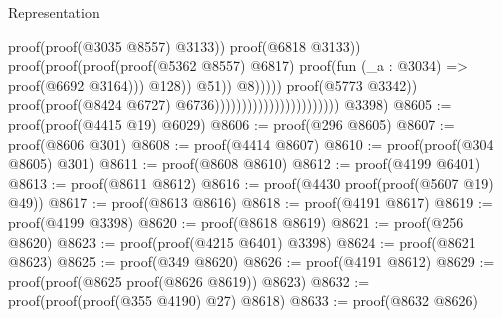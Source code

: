 \begin{lexlean}{Representation}
\begin{coremodule}
                                                                                                      proof(proof(@3035
                                                                                                            @8557)
                                                                                                          @3133))
                                                                                                    proof(@6818
                                                                                                        @3133))
                                                                                                  proof(proof(proof(proof(@5362
                                                                                                            @8557)
                                                                                                          @6817)
                                                                                                        proof(fun (_a : @3034) =>
                                                                                                          proof(@6692
                                                                                                              @3164)))
                                                                                                      @128))
                                                                                                @51))
                                                                                          @8)))))
                                                                            proof(@5773 @3342))
                                                                          proof(proof(@8424 @6727)
                                                                              @6736)))))))))))))))))))))))
      @3398)
@8605 := proof(proof(@4415 @19) @6029)
@8606 := proof(@296 @8605)
@8607 := proof(@8606 @301)
@8608 := proof(@4414 @8607)
@8610 := proof(proof(@304 @8605) @301)
@8611 := proof(@8608 @8610)
@8612 := proof(@4199 @6401)
@8613 := proof(@8611 @8612)
@8616 := proof(@4430 proof(proof(@5607 @19) @49))
@8617 := proof(@8613 @8616)
@8618 := proof(@4191 @8617)
@8619 := proof(@4199 @3398)
@8620 := proof(@8618 @8619)
@8621 := proof(@256 @8620)
@8623 := proof(proof(@4215 @6401) @3398)
@8624 := proof(@8621 @8623)
@8625 := proof(@349 @8620)
@8626 := proof(@4191 @8612)
@8629 := proof(proof(@8625 proof(@8626 @8619)) @8623)
@8632 := proof(proof(proof(@355 @4190) @27) @8618)
@8633 := proof(@8632 @8626)

\end{coremodule}
\end{lexlean}
